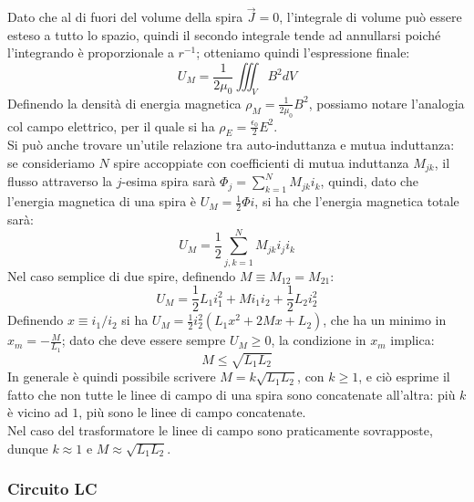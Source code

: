 Dato che al di fuori del volume della spira $ \vec{J} = 0 $, l'integrale di volume può essere esteso a tutto lo spazio, quindi il secondo integrale tende ad annullarsi poiché l'integrando è proporzionale a $ r^{-1} $; otteniamo quindi l'espressione finale:
\begin{equation}
	U_M = \frac{1}{2\mu_0} \iiint_V B^2 dV
	\label{eq:37}
\end{equation}
%
Definendo la densità di energia magnetica $ \rho_M = \frac{1}{2\mu_0}B^2 $, possiamo notare l'analogia col campo elettrico, per il quale si ha $ \rho_E = \frac{\epsilon_0}{2}E^2 $. \\ 
%
Si può anche trovare un'utile relazione tra auto-induttanza e mutua induttanza: se consideriamo $ N $ spire accoppiate con coefficienti di mutua induttanza $ M_{jk} $, il flusso attraverso la $ j $-esima spira sarà $ \Phi_j  = \sum_{k=1}^{N} M_{jk}i_k $, quindi, dato che l'energia magnetica di una spira è $ U_M = \frac{1}{2}\Phi i $, si ha che l'energia magnetica totale sarà:
\begin{equation}
	U_M = \frac{1}{2} \displaystyle\sum_{j,k=1}^{N} M_{jk} i_j i_k
	\label{eq:38}
\end{equation}
Nel caso semplice di due spire, definendo $ M \equiv M_{12} = M_{21} $:
\begin{equation}
	U_M = \frac{1}{2} L_1 i_1^2 + M i_1 i_2 + \frac{1}{2} L_2 i_2^2
	\label{eq:39}
\end{equation}
Definendo $ x \equiv i_1 / i_2 $ si ha $ U_M = \frac{1}{2} i_2^2 (L_1 x^2 + 2Mx + L_2) $, che ha un minimo in $ x_m = -\frac{M}{L_1} $; dato che deve essere sempre $ U_M \ge 0 $, la condizione in $ x_m $ implica:
\begin{equation}
	M \le \sqrt{L_1 L_2}
	\label{eq:40}
\end{equation}
%
In generale è quindi possibile scrivere $ M = k \sqrt{L_1 L_2} $, con $ k \ge 1 $, e ciò esprime il fatto che non tutte le linee di campo di una spira sono concatenate all'altra: più $ k $ è vicino ad $ 1 $, più sono le linee di campo concatenate. \\ 
Nel caso del trasformatore le linee di campo sono praticamente sovrapposte, dunque $ k \approx 1 $ e $ M \approx \sqrt{L_1 L_2} $.

\subsubsection{Circuito LC}

